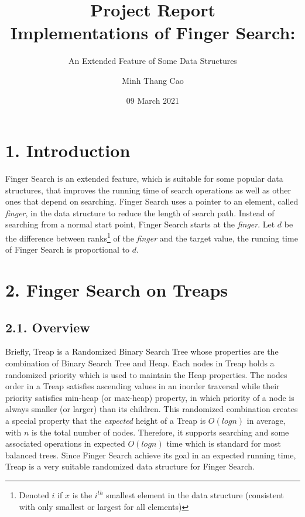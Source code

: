 \documentclass[12pt,english,]{article}
\title{\textbf{Project Report}\\
\Large{Implementations of Finger Search:}}
\subtitle{An Extended Feature of Some Data Structures}
\author{Minh Thang Cao}
\date{09 March 2021}
\begin{document}
\maketitle

\graphicspath{ {./} }

\hypertarget{section1}{%
\section{\texorpdfstring{1.
\enspace Introduction}{1. Introduction}}\label{section1}}

Finger Search is an extended feature, which is suitable for some popular
data structures, that improves the running time of search operations as
well as other ones that depend on searching. Finger Search uses a
pointer to an element, called \emph{finger}, in the data structure to
reduce the length of search path. Instead of searching from a normal
start point, Finger Search starts at the \emph{finger}. Let \(d\) be the
difference between ranks\footnote{Denoted \(i\) if \(x\) is the
  \(i^{th}\) smallest element in the data structure (consistent with
  only smallest or largest for all elements)} of the \emph{finger} and
the target value, the running time of Finger Search is proportional to
\(d\).

\hypertarget{section2}{%
\section{\texorpdfstring{2. \enspace Finger Search on
Treaps}{2. Finger Search on Treaps}}\label{section2}}

\hypertarget{overview}{%
\subsection{2.1. Overview}\label{overview}}

Briefly, Treap is a Randomized Binary Search Tree whose properties are
the combination of Binary Search Tree and Heap. Each nodes in Treap
holds a randomized priority which is used to maintain the Heap
properties. The nodes order in a Treap satisfies ascending values in an
inorder traversal while their priority satisfies min-heap (or max-heap)
property, in which priority of a node is always smaller (or larger) than
its children. This randomized combination creates a special property
that the \emph{expected} height of a Treap is \(O(logn)\) in average,
with \(n\) is the total number of nodes. Therefore, it supports
searching and some associated operations in expected \(O(logn)\) time
which is standard for most balanced trees. Since Finger Search achieve
its goal in an expected running time, Treap is a very suitable
randomized data structure for Finger Search.
\end{document}
